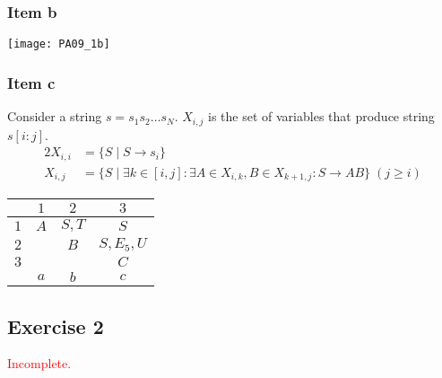 {\subsubsection{Item b}
\begin{center} \texttt{[image: PA09\_1b]} \end{center}
\subsubsection{Item c}
Consider a string $s=s_1s_2\ldots s_N$. $X_{i,j}$ is the set of variables that produce string $s[i:j]$.
\begin{alignat*}{2}
	X_{i,i} &= \{S\;|\;S \rightarrow s_i\}\\
	X_{i,j} &= \{S\;|\;\exists k \in [i,j] \colon \exists A\in X_{i,k},B\in X_{k+1,j}\colon S \rightarrow AB\}\;(j \geq i)
\end{alignat*}
\begin{center} \begin{tabular}{c || c | c | c}
	\backslashbox{$i$}{$j$} & $1             $ & $2             $ & $3      $ \\ \hline
	$1                    $ & $A             $ & $S, T          $ & $S      $ \\
    $2                    $ & \cellcolor{gray} & $B             $ & $S,E_5,U$ \\
	$3                    $ & \cellcolor{gray} & \cellcolor{gray} & $C      $ \\ \hline
	$                     $ & $a             $ & $b$     & $c$
\end{tabular} \end{center}
\subsection{Exercise 2}
\textcolor{red}{Incomplete.}
}